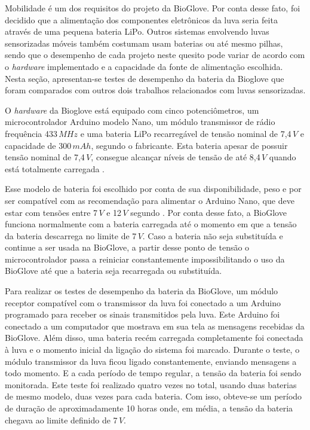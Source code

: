 \documentclass[
	12pt,				%
	openright,			%
	oneside,			%
	a4paper,			%
	english,			%
	brazil				%
	]{abntex2}
\begin{document}
			Mobilidade é um dos requisitos do projeto da BioGlove. Por conta desse fato, foi decidido que a alimentação dos componentes eletrônicos da luva seria feita através de uma pequena bateria LiPo. Outros sistemas envolvendo luvas sensorizadas móveis também costumam usam baterias ou até mesmo pilhas, sendo que o desempenho de cada projeto neste quesito pode variar de acordo com o \textit{hardware} implementado e a capacidade da fonte de alimentação escolhida. Nesta seção, apresentan-se testes de desempenho da bateria da Bioglove que foram comparados com outros dois trabalhos relacionados com luvas sensorizadas.

			O \textit{hardware} da Bioglove está equipado com cinco potenciômetros, um microcontrolador Arduino modelo Nano, um módulo transmissor de rádio frequência 433$\,MHz$ e uma bateria LiPo recarregável de tensão nominal de 7,4$\,V$ e capacidade de 300$\,mAh$, segundo o fabricante. Esta bateria apesar de possuir tensão nominal de 7,4$\,V$, consegue alcançar níveis de tensão de até 8,4$\,V$ quando está totalmente carregada \cite{buchmann2016batteries}.

			Esse modelo de bateria foi escolhido por conta de sua disponibilidade, peso e por ser compatível com as recomendação para alimentar o Arduino Nano, que deve estar com tensões entre 7$\,V$ e 12$\,V$ segundo \cite{arduinopowerrange}. Por conta desse fato, a BioGlove funciona normalmente com a bateria carregada até o momento em que a tensão da bateria descarrega no limite de 7$\,V$. Caso a bateria não seja substituída e continue a ser usada na BioGlove, a partir desse ponto de tensão o microcontrolador passa a reiniciar constantemente impossibilitando o uso da BioGlove até que a bateria seja recarregada ou substituída.

			Para realizar os testes de desempenho da bateria da BioGlove, um módulo receptor compatível com o transmissor da luva foi conectado a um Arduino programado para receber os sinais transmitidos pela luva. Este Arduino foi conectado a um computador que mostrava em sua tela as mensagens recebidas da BioGlove. Além disso, uma bateria recém carregada completamente foi conectada à luva e o momento inicial da ligação do sistema foi marcado. Durante o teste, o módulo transmissor da luva ficou ligado constantemente, enviando mensagens a todo momento. E a cada período de tempo regular, a tensão da bateria foi sendo monitorada. Este teste foi realizado quatro vezes no total, usando duas baterias de mesmo modelo, duas vezes para cada bateria. Com isso, obteve-se um período de duração de aproximadamente 10 horas onde, em média, a tensão da bateria chegava ao limite definido de 7$\,V$.
\end{document}
